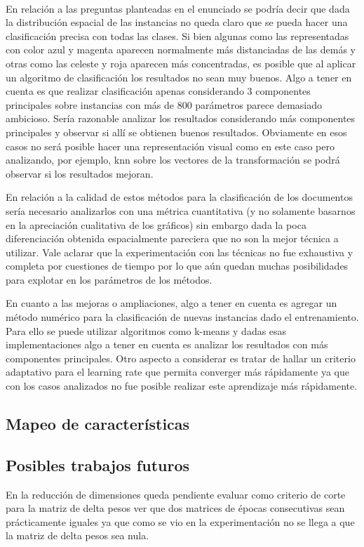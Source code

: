 \documentclass[informe.tex]{subfiles}
\begin{document}
      ~
      
      En relación a las preguntas planteadas en el enunciado se podría decir que dada la distribución espacial de las instancias no queda claro que se pueda hacer una clasificación precisa con todas las clases. Si bien algunas como las representadas con color azul y magenta aparecen normalmente más distanciadas de las demás y otras como las celeste y roja aparecen más concentradas, es posible que al aplicar un algoritmo de clasificación los resultados no sean muy buenos. Algo a tener en cuenta es que realizar clasificación apenas considerando 3 componentes principales sobre instancias con más de 800 parámetros parece demasiado ambicioso. Sería razonable analizar los resultados considerando más componentes principales y observar si all\'i se obtienen buenos resultados. Obviamente en esos casos no ser\'a posible hacer una representaci\'on visual como en este caso pero analizando, por ejemplo, knn sobre los vectores de la transformación se podr\'a observar si los resultados mejoran.
      
      En relación a la calidad de estos métodos para la clasificación de los documentos sería necesario analizarlos con una métrica cuantitativa (y no solamente basarnos en la apreciación cualitativa de los gráficos) sin embargo dada la poca diferenciación obtenida espacialmente pareciera que no son la mejor técnica a utilizar. Vale aclarar que la experimentación con las técnicas no fue exhaustiva y completa por cuestiones de tiempo por lo que aún quedan muchas posibilidades para explotar en los parámetros de los métodos.
      
      En cuanto a las mejoras o ampliaciones, algo a tener en cuenta es agregar un m\'etodo num\'erico para la clasificaci\'on de nuevas instancias dado el entrenamiento. Para ello se puede utilizar algoritmos como k-means y dadas esas implementaciones algo a tener en cuenta es analizar los resultados con más componentes principales. Otro aspecto a considerar es tratar de hallar un criterio adaptativo para el learning rate que permita converger más rápidamente ya que con los casos analizados no fue posible realizar este aprendizaje más rápidamente.
      
      
      
    \subsection{Mapeo de características}
  
    \subsection{Posibles trabajos futuros}
    
      En la reducción de dimensiones queda pendiente evaluar como criterio de corte para la matriz de delta pesos ver que dos matrices de épocas consecutivas sean prácticamente iguales ya que como se vio en la experimentación no se llega a que la matriz de delta pesos sea nula.
\end{document}
